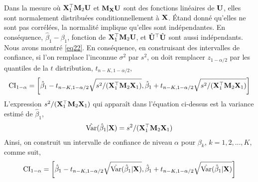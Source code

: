 Dans la mesure où $\mathbf X_1^\top\mathbf M_2\mathbf U$ et $\mathbf M_\mathbf X\mathbf U$ sont des fonctions linéaires de $\mathbf U$, elles sont normalement distribuées conditionnellement à $\mathbf X$. \'Etand donné qu'elles ne sont pas corrélées, la normalité implique qu'elles sont indépendantes. En conséquence, $\hat{\beta}_1 - \beta_1$, fonction de  $\mathbf X_1^\top\mathbf M_2\mathbf U$, et $\hat{\mathbf U}^\top\hat{\mathbf U}$ sont aussi indépendants.\\
Nous avons montré \eqref{eq22}. En conséquence, en construisant des intervalles de confiance, si l'on remplace l'inconnue $\sigma^2$ par $s^2$, on doit remplacer $z_{1-\alpha/2}$ par les quantiles de la $t$ distribution, $t_{n-K, 1-\alpha/2}$,
\begin{align*}
\mathrm{CI}_{1-\alpha} = \left[\hat{\beta}_1 - t_{n-K, 1-\alpha/2}\sqrt{s^2/(\mathbf X_1^\top\mathbf M_2\mathbf X_1)}, 
\hat{\beta}_1 + t_{n-K, 1-\alpha/2}\sqrt{s^2/(\mathbf X_1^\top\mathbf M_2\mathbf X_1)}\right]
\end{align*}
L'expression $s^2/(\mathbf X_1^\top\mathbf M_2\mathbf X_1)$ qui apparaît dans l'équation ci-dessus est la variance estimé de $\hat{\beta}_1$,
\begin{align*}
\hat{\operatorname{Var}}(\hat{\beta} _1| \mathbf X) = s^2/(\mathbf X_1^\top\mathbf M_2\mathbf X_1)
\end{align*}
Ainsi, on construit un intervalle de confiance de niveau $\alpha$ pour $\beta_k$, $k=1, 2,...,K$, comme suit,
\begin{align}
\mathrm{CI}_{1-\alpha} = \left[\hat{\beta}_1 - t_{n-K, 1-\alpha/2}\sqrt{\hat{\operatorname{Var}}(\hat{\beta} _1| \mathbf X)}, 
\hat{\beta}_1 + t_{n-K, 1-\alpha/2}\sqrt{\hat{\operatorname{Var}}(\hat{\beta} _1| \mathbf X)}\right]
\label{eq27}
\end{align}

